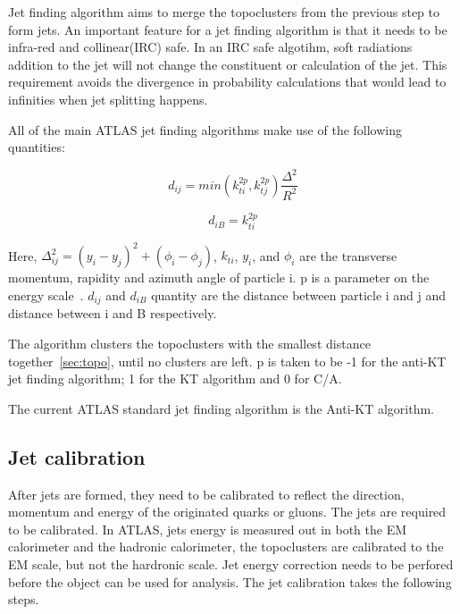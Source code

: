 Jet finding algorithm aims to merge the topoclusters from the previous step to form jets. An important feature for a jet finding algorithm is that it needs to be infra-red and collinear(IRC) safe. In an IRC safe algotihm, soft radiations addition to the jet will not change the constituent or calculation of the jet. This requirement avoids the divergence in probability calculations that would lead to infinities when  jet splitting happens.

All of the main ATLAS jet finding algorithms make use of the following quantities:

\begin{equation}
    d_{ij} = min(k_{ti}^{2p}, k_{tj}^{2p}) \frac{\Delta^{2}}{R^{2}}
    \label{sec:topo}
\end{equation}

\begin{equation}
    d_{iB} = k^{2p}_{ti}
\end{equation}

Here, $\Delta_{ij}^{2} = (y_{i}- y_{j})^2 + (\phi_{i} - \phi_{j})$, $k_{ti}
$, $y_{i}$, and $\phi_{i}$ are the transverse momentum, rapidity and azimuth angle of particle i. p is a parameter on the energy scale~\cite{HEP2008}. $d_{ij}$ and $d_{iB}$ quantity are the distance between particle i and j and distance between i and B respectively. 

The algorithm clusters the topoclusters with the smallest distance together~\ref{sec:topo}, until no clusters are left. p is taken to be -1 for the anti-KT jet finding algorithm; 1 for the KT algorithm and 0 for C/A. 

The current ATLAS standard jet finding algorithm is the Anti-KT algorithm.

\subsection{Jet calibration}
After jets are formed, they need to be calibrated to reflect the direction, momentum and energy of the originated quarks or gluons. The jets are required to be calibrated. In ATLAS, jets energy is measured out in both the EM calorimeter and the hadronic calorimeter, the topoclusters are calibrated to the EM scale, but not the hardronic scale. Jet energy correction needs to be perfored before the object can be used for analysis. The jet calibration takes the following steps.


